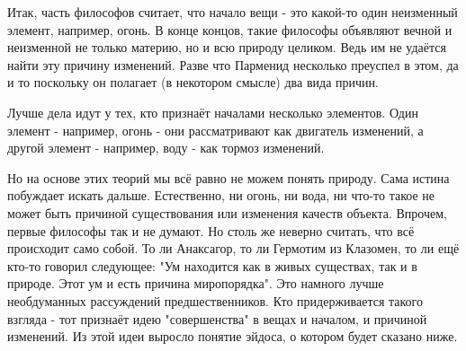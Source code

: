 \documentclass{article}
\begin{document}
Итак, часть философов считает, что начало вещи - это какой-то один неизменный элемент, например, огонь. В конце концов, такие философы объявляют вечной и неизменной не только материю, но и всю природу целиком. Ведь им не удаётся найти эту причину изменений. Разве что Парменид несколько преуспел в этом, да и то поскольку он полагает (в некотором смысле) два вида причин.

Лучше дела идут у тех, кто признаёт началами несколько элементов. Один элемент - например, огонь - они рассматривают как двигатель изменений, а другой элемент - например, воду - как тормоз изменений.

Но на основе этих теорий мы всё равно не можем понять природу. Сама истина побуждает искать дальше. Естественно, ни огонь, ни вода, ни что-то такое не может быть причиной существования или изменения качеств объекта. Впрочем, первые философы так и не думают. Но столь же неверно считать, что всё происходит само собой. То ли Анаксагор, то ли Гермотим из Клазомен, то ли ещё кто-то говорил следующее: "Ум находится как в живых существах, так и в природе. Этот ум и есть причина миропорядка". Это намного лучше необдуманных рассуждений предшественников. Кто придерживается такого взгляда - тот признаёт идею "совершенства" в вещах и началом, и причиной изменений. Из этой идеи выросло понятие эйдоса, о котором будет сказано ниже.
\end{document}
